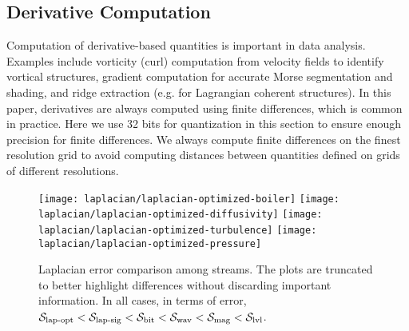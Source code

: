 \subsection{Derivative Computation} \label{sec:derivatives}

Computation of derivative-based quantities is important in data analysis. Examples include vorticity
(curl) computation from velocity fields to identify vortical structures, gradient computation for
accurate Morse segmentation and shading, and ridge extraction (e.g. for Lagrangian coherent
structures). In this paper, derivatives are always computed using finite differences, which is
common in practice. Here we use 32 bits for quantization in this section to ensure enough precision for
finite differences. We always compute finite differences on the finest resolution grid to avoid
computing distances between quantities defined on grids of different resolutions.

\begin{figure*}[h]
\centering
{}
{\texttt{[image: laplacian/laplacian-optimized-boiler]}}
{\texttt{[image: laplacian/laplacian-optimized-diffusivity]}}
{\texttt{[image: laplacian/laplacian-optimized-turbulence]}}
{\texttt{[image: laplacian/laplacian-optimized-pressure]}}
\caption{Laplacian error comparison among streams. The plots are truncated to better highlight
differences without discarding important information. In all cases, in terms of error, $\slop <
\slsg < \sbit < \swav < \smag < \slvl$.}
\label{fig:laplacian-error-comparison}
\end{figure*}

